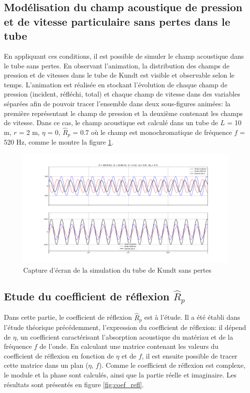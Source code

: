 \documentclass[a4paper,11pt]{article}
\begin{document}
\subsection{Modélisation du champ acoustique de pression et de vitesse particulaire sans pertes dans le tube}
En appliquant ces conditions, il est possible de simuler le champ acoustique dans le tube sans pertes. En observant l'animation, la distribution des champs de pression et de vitesses dans le tube de Kundt est visible et observable selon le temps. L'animation est réalisée en stockant l'évolution de chaque champ de pression (incident, réfléchi, total) et chaque champ de vitesse dans des variables séparées afin de pouvoir tracer l'ensemble dans deux sous-figures animées: la première représentant le champ de pression et la deuxième contenant les champs de vitesse. Dans ce cas, le champ acoustique est calculé dans un tube de $L$ = 10 m, $r$ = 2 m, $\eta$ = 0, $\hat{R}_p$ = 0.7 où le champ est monochromatique de fréquence $f$ = 520 Hz, comme le montre la figure \ref{fig:sspertes}.

\begin{figure}[H]
	\centering 
	\includegraphics[width=\linewidth]{Figures/tubeKundt_ssperte.pdf}
	\caption{Capture d'écran de la simulation du tube de Kundt sans pertes}
	\label{fig:sspertes} 
\end{figure}

\subsection{Etude du coefficient de réflexion $\hat{R}_p$}
Dans cette partie, le coefficient de réflexion $\hat{R}_p$ est à l'étude. Il a été établi dans l'étude théorique précédemment, l'expression du coefficient de réflexion: il dépend de $\eta$, un coefficient caractérisant l'absorption acoustique du matériau et de la fréquence $f$ de l'onde.
En calculant une matrice contenant les valeurs du coefficient de réflexion en fonction de $\eta$ et de $f$, il est ensuite possible de tracer cette matrice dans un plan ($\eta$, $f$). Comme le coefficient de réflexion est complexe, le module et la phase sont calculés, ainsi que la partie réelle et imaginaire. Les résultats sont présentés en figure \ref{fig:coef_refl}.
\end{document}
